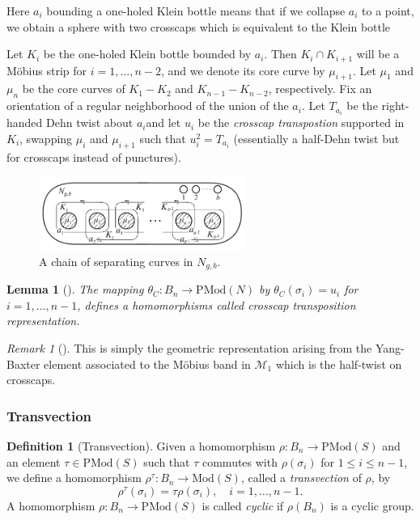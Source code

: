 \documentclass[reqno]{amsart}
\newtheorem{lemma}[theorem]{Lemma}
\theoremstyle{definition}
\newtheorem{definition}[theorem]{Definition}
\theoremstyle{remark}
\newtheorem*{remark}{Remark}
\newcommand{\Mod}{{\mathrm{Mod}}}
\newcommand{\PMod}{{\mathrm{PMod}}}
\begin{document}
Here $a_i$ bounding a one-holed Klein bottle means
that if we collapse $a_i$ to a point, we obtain a 
sphere with two crosscaps which is equivalent to the Klein bottle


Let $K_i$ be the one-holed Klein bottle bounded by
$a_i$. Then $K_i \cap K_{i+1}$ will be a Möbius strip
for $i = 1, \ldots, n-2$, and we denote its core curve
by $\mu_{i+1}$. Let $\mu_1$ and $\mu_n$ be the core curves
of $K_1 - K_2$ and $K_{n-1} - K_{n-2}$, respectively.
Fix an orientation of a regular neighborhood of
the union of the $a_i$. Let $T_{a_i}$ be the right-handed
Dehn twist about $a_i$and let $u_i$ be the 
\textit{crosscap transpostion} supported
in $K_i$, swapping $\mu_i$ and $\mu_{i+1}$ such that
$u_i^2 = T_{a_i}$ (essentially a half-Dehn twist but for crosscaps
instead of punctures).

\begin{figure}[H]
    \centering
    \includegraphics[width=0.6\textwidth]{chain-separating-curves.png}
    \caption{A chain of separating curves in
    $N_{g,b}$.}
    \label{fig:chain-separating-curves-png}
\end{figure}


\begin{lemma}[]
    The mapping $\theta_{C} \colon B_n \to \PMod (N)$ by
    $\theta_C \left( \sigma_i \right) =u_i$ for
    $i = 1,\ldots, n-1$, defines a homomorphisms
    called crosscap transposition representation.
\end{lemma}

\begin{remark}[]
    This is simply the geometric representation
    arising from the Yang-Baxter element associated to
    the Möbius band in $\mathcal{M}_1$ which
    is the half-twist on crosscaps.
\end{remark}


\subsubsection{Transvection}

\begin{definition}[Transvection]
    Given a homomorphism
    $\rho \colon B_n \to \PMod (S)$ and an element
    $\tau \in \PMod (S)$ such that
    $\tau$ commutes with $\rho\left( \sigma_i \right) $ 
    for $1 \le i \le n-1$, we define a homomorphism
    $\rho^{\tau} \colon B_n \to \Mod (S)$, called
    a \textit{transvection} of $\rho$, by
    \[
        \rho^{\tau} \left( \sigma_i \right) 
        = \tau \rho \left( \sigma_i \right) , \quad
        i = 1,\ldots, n-1.
    \] 
    A homomorphism $\rho \colon B_n \to \PMod (S)$ is called
    \textit{cyclic} if $\rho \left( B_n \right) $ is a 
    cyclic group. 
\end{definition}
\end{document}
